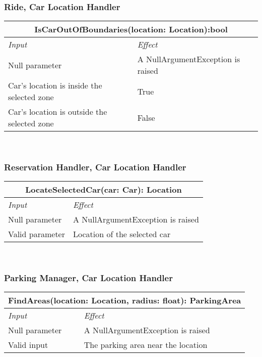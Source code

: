 			\subsubsection*{Ride, Car Location Handler}
			\begin{tabular}{ |l|l| }
				\hline
				\multicolumn{2}{|c|}{IsCarOutOfBoundaries(location: Location):bool}\\
				\hline
				\textit{Input}&\textit{Effect}\\ \hline
				Null parameter & A NullArgumentException is raised\\ \hline
				Car's location is inside the selected zone & True  \\ \hline
				Car's location is outside the selected zone & False  \\ \hline
			\end{tabular}
			\\
			
			\subsubsection*{Reservation Handler, Car Location Handler} 
			\begin{tabular}{ |l|l| }
				\hline
				\multicolumn{2}{|c|}{LocateSelectedCar(car: Car): Location}\\
				\hline
				\textit{Input}&\textit{Effect}\\ \hline
				Null parameter & A NullArgumentException is raised\\ \hline
				Valid parameter &  Location of the selected car \\ \hline
			\end{tabular}
			\\
			
			\subsubsection*{Parking Manager, Car Location Handler} 
			\begin{tabular}{ |l|l| }
				\hline
				\multicolumn{2}{|c|}{ FindAreas(location: Location, radius: float): ParkingArea}\\
				\hline
				\textit{Input}&\textit{Effect}\\ \hline
				Null parameter & A NullArgumentException is raised\\ \hline
				Valid input & The parking area near the location \\ \hline
			\end{tabular}
			\\
			
